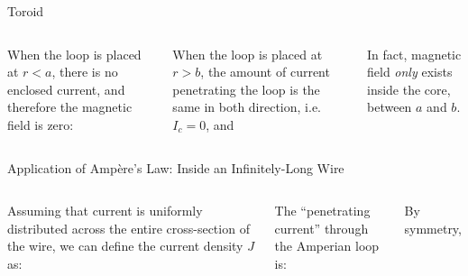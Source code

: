 \documentclass[12pt,aspectratio=169]{beamer}
\begin{document}
\begin{frame}{Toroid}
  \begin{columns}

    When the loop is placed at $r<a$, there is no enclosed
    current, and therefore the magnetic field is zero:


    \vspace{-.2in}When the loop is placed at $r>b$, the amount of current
    penetrating the loop is the same in both direction, i.e.\ $I_c=0$, and

    
    \vspace{-.1in}In fact, magnetic field \emph{only} exists inside the core,
    between $a$ and $b$.
  \end{columns}
\end{frame}



\begin{frame}{Application of Amp\`{e}re's Law: Inside an Infinitely-Long Wire}
  \begin{columns}[T]
    \centering

    Assuming that current is uniformly distributed across the entire
    cross-section of the wire, we can define the current density $J$ as:


    \vspace{-.1in}The ``penetrating current'' through the Amperian loop is:


    \vspace{-.05in}By symmetry,

  \end{columns}
\end{frame}
\end{document}
